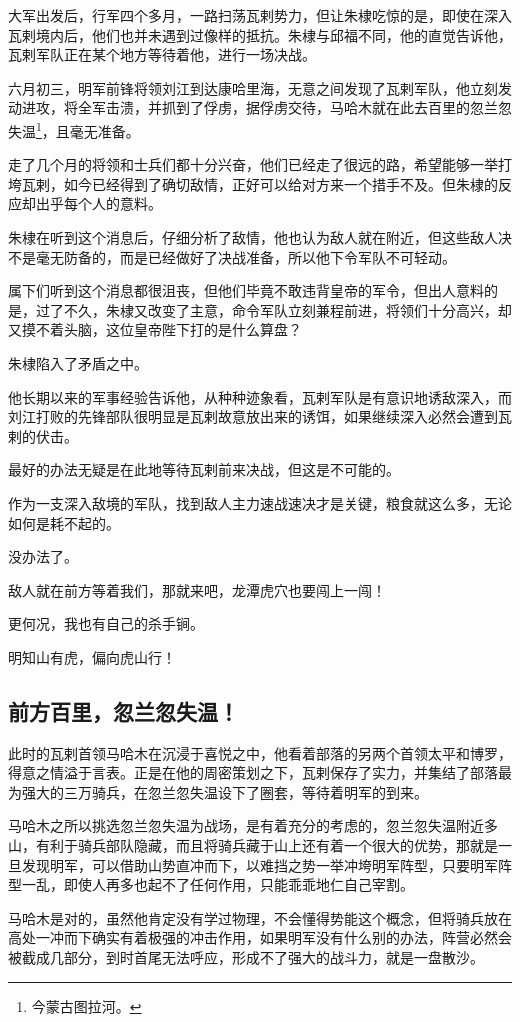 \begin{multicols}{\theparacolNo}
大军出发后，行军四个多月，一路扫荡瓦剌势力，但让朱棣吃惊的是，即使在深入瓦剌境内后，他们也并未遇到过像样的抵抗。朱棣与邱福不同，他的直觉告诉他，瓦剌军队正在某个地方等待着他，进行一场决战。

六月初三，明军前锋将领刘江到达康哈里海，无意之间发现了瓦剌军队，他立刻发动进攻，将全军击溃，并抓到了俘虏，据俘虏交待，马哈木就在此去百里的忽兰忽失温\footnote{今蒙古图拉河。}，且毫无准备。

走了几个月的将领和士兵们都十分兴奋，他们已经走了很远的路，希望能够一举打垮瓦剌，如今已经得到了确切敌情，正好可以给对方来一个措手不及。但朱棣的反应却出乎每个人的意料。

朱棣在听到这个消息后，仔细分析了敌情，他也认为敌人就在附近，但这些敌人决不是毫无防备的，而是已经做好了决战准备，所以他下令军队不可轻动。

属下们听到这个消息都很沮丧，但他们毕竟不敢违背皇帝的军令，但出人意料的是，过了不久，朱棣又改变了主意，命令军队立刻兼程前进，将领们十分高兴，却又摸不着头脑，这位皇帝陛下打的是什么算盘？

朱棣陷入了矛盾之中。

他长期以来的军事经验告诉他，从种种迹象看，瓦剌军队是有意识地诱敌深入，而刘江打败的先锋部队很明显是瓦剌故意放出来的诱饵，如果继续深入必然会遭到瓦剌的伏击。

最好的办法无疑是在此地等待瓦剌前来决战，但这是不可能的。

作为一支深入敌境的军队，找到敌人主力速战速决才是关键，粮食就这么多，无论如何是耗不起的。

没办法了。

敌人就在前方等着我们，那就来吧，龙潭虎穴也要闯上一闯！

更何况，我也有自己的杀手锏。

明知山有虎，偏向虎山行！

\subsection{前方百里，忽兰忽失温！}
此时的瓦剌首领马哈木在沉浸于喜悦之中，他看着部落的另两个首领太平和博罗，得意之情溢于言表。正是在他的周密策划之下，瓦剌保存了实力，并集结了部落最为强大的三万骑兵，在忽兰忽失温设下了圈套，等待着明军的到来。

马哈木之所以挑选忽兰忽失温为战场，是有着充分的考虑的，忽兰忽失温附近多山，有利于骑兵部队隐藏，而且将骑兵藏于山上还有着一个很大的优势，那就是一旦发现明军，可以借助山势直冲而下，以难挡之势一举冲垮明军阵型，只要明军阵型一乱，即使人再多也起不了任何作用，只能乖乖地仁自己宰割。

马哈木是对的，虽然他肯定没有学过物理，不会懂得势能这个概念，但将骑兵放在高处一冲而下确实有着极强的冲击作用，如果明军没有什么别的办法，阵营必然会被截成几部分，到时首尾无法呼应，形成不了强大的战斗力，就是一盘散沙。


\end{multicols}
